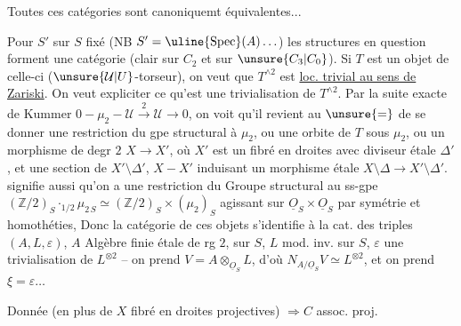  Toutes ces catégories sont canoniquemt équivalentes...

 Pour $S'$ sur $S$ fixé (NB $S'=\uline{\operatorname{Spec}}(A)\ldots$) les structures en question forment une  catégorie (clair sur $C_2$ et sur $\unsure{C_3|C_0}$). Si $T$ est un objet de celle-ci ($\unsure{\mathcal U|U}$-torseur), on veut que $T^{\wedge 2}$ est \uline{loc. trivial au sens de Zariski}.
 On veut expliciter ce qu'est une trivialisation de $T^{\wedge 2}$. Par la suite exacte de Kummer $0-\mu_2-\mathcal U\xrightarrow{2}\mathcal U\longrightarrow 0$, on voit qu'il revient au $\unsure{=}$ de se donner une restriction du gpe structural à $\mu_2$, ou une orbite  de $T$ sous $\mu_2$, ou un morphisme de degr $2$ $X\longrightarrow X'$, où $X'$ est un fibré en droites avec diviseur  étale $\Delta'$, et une section  de $X'\setminus\Delta'$, $X-X'$ induisant un morphisme  étale
 $X\setminus\Delta\longrightarrow X'\setminus\Delta'$.  signifie aussi qu'on a une restriction du Groupe structural au ss-gpe $(\mathbb Z/2)_S\mathbin{\cdot}_{1/2}\mu_{2\,S}\simeq(\mathbb Z/2)_S\times(\mu_2)_S$ agissant sur $\underline O_S\times\underline O_S$ par symétrie et homothéties, Donc la catégorie de ces objets
 s'identifie à la cat. des triples $(A,L,\varepsilon)$, $A$ Algèbre finie étale de rg $2$, sur $S$, $L$ mod. inv. sur $S$, $\varepsilon$ une trivialisation de $L^{\otimes2}$ -- on prend $V=A\otimes_{\underline O_S}L$, d'où $N_{A/\underline O_S}V\simeq L^{\otimes2}$, et on prend $\xi=\varepsilon\ldots$

 

Donnée (en plus de $X$ fibré en droites projectives)  $\Rightarrow C$ assoc. proj.

